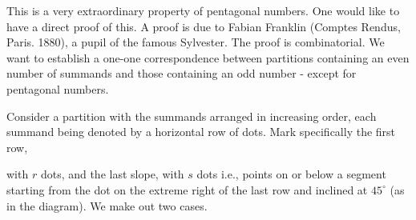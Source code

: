 This is a very extraordinary property of pentagonal numbers. One would
like to have a direct proof of this. A proof is due to Fabian Franklin
(Comptes Rendus, Paris. 1880), a pupil of the famous Sylvester. The
proof is combinatorial. We want to establish a one-one correspondence
between partitions containing an even number of summands and those
containing an odd number - except for pentagonal numbers.

Consider a partition with the summands arranged in increasing order,
each summand being denoted by a horizontal row of dots. Mark
specifically the first row,

\begin{figure}[H]
\end{figure}
with $r$ dots, and the last slope, with $s$ dots i.e., points on or
below a segment starting from the dot on the extreme right of the
last row and inclined at $45^\circ$ (as in the diagram). We make out
two cases. 
